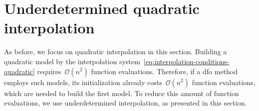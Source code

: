 

\section{Underdetermined quadratic interpolation}
\label{sec:underdetermined-interpolation}

As before, we focus on quadratic interpolation in this section.
Building a quadratic model by the interpolation system~\cref{eq:interpolation-conditions-quadratic} requires~$\mathcal{O}(n^2)$ function evaluations.
Therefore, if a \gls{dfo} method employs such models, its initialization already costs~$\mathcal{O}(n^2)$ function evaluations, which are needed to build the first model.
To reduce this amount of function evaluations, we use underdetermined interpolation, as presented in this section.

